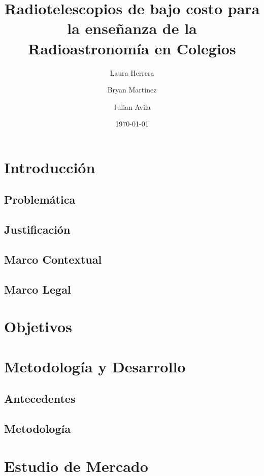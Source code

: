 \documentclass[sn-mathphys]{svmono}
\title{\Huge \textbf{Radiotelescopios de bajo costo para la enseñanza de la Radioastronomía en Colegios}}
\author{Laura Herrera \and Bryan Martinez \and Julian Avila}
\date{\today}
\begin{document}
\maketitle

\tableofcontents

\newpage

\chapter{Introducción}
\section{Problemática}


\section{Justificación}


\section{Marco Contextual}


\section{Marco Legal}


\chapter{Objetivos}


\chapter{Metodología y Desarrollo}

\section{Antecedentes}



\section{Metodología}



\chapter{Estudio de Mercado}%
\label{cha:Estudio de Mercado}



\printbibliography
\end{document}
